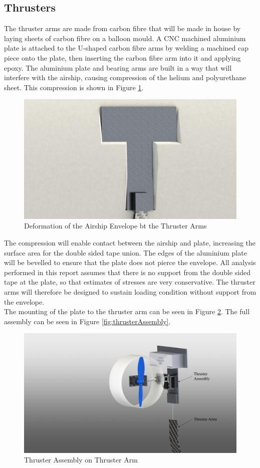 \documentclass[../main.tex]{subfiles}
\begin{document}
\subsection{Thrusters}
The thruster arms are made from carbon fibre that will be made in house by laying sheets of carbon fibre on a balloon mould. A CNC machined aluminium plate is attached to the U-shaped carbon fibre arms by welding a machined cap piece onto the plate, then inserting the carbon fibre arm into it and applying epoxy. The aluminium plate and bearing arms are built in a way that will interfere with the airship, causing compression of the helium and polyurethane sheet. This compression is shown in Figure \ref{fig:envelopeDeformation}.

\begin{figure}[H]
	\centering
	\includegraphics[width=.8\linewidth]{img/design/thruster/envelopeDeformation.JPG}
	\caption{Deformation of the Airship Envelope bt the Thruster Arms}
	\label{fig:envelopeDeformation}
\end{figure}

The compression will enable contact between the airship and plate, increasing the surface area for the double sided tape union. The edges of the aluminium plate will be bevelled to ensure that the plate does not pierce the envelope. All analysis performed in this report assumes that there is no support from the double sided tape at the plate, so that estimates of stresses are very conservative. The thruster arms will therefore be designed to sustain loading condition without support from the envelope.\\

The mounting of the plate to the thruster arm can be seen in Figure \ref{fig:thrusterOnKeel}. The full assembly can be seen in Figure \ref{fig:thrusterAssembly}.  

\begin{figure}[H]
	\centering
	\includegraphics[width=.8\linewidth]{img/design/thruster/thrusterOnKeel.png}
	\caption{Thruster Assembly on Thruster Arm}
	\label{fig:thrusterOnKeel}
\end{figure}
\end{document}
